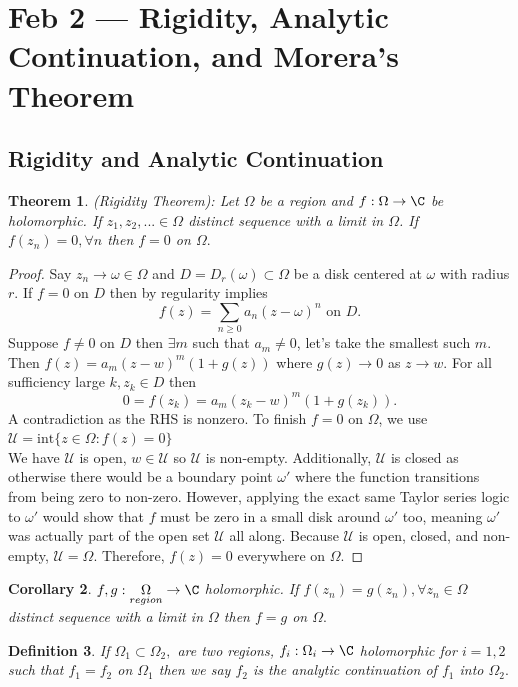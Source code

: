 \documentclass[a4paper]{article}
\newtheorem{thm}{Theorem}[section]
\newtheorem{defn}[thm]{Definition}
\newtheorem{cor}[thm]{Corollary}
\begin{document}
\section{Feb 2 --- Rigidity, Analytic Continuation, and Morera's Theorem}
\subsection{Rigidity and Analytic Continuation}
\begin{thm}
    (Rigidity Theorem): Let $\Omega$ be a region and $f:\Omega\to \C$ be holomorphic. If $z_1,z_2,...\in \Omega$ distinct sequence with a limit in $\Omega$. If $f(z_n)=0, \forall n$ then $f=0$ on $\Omega.$
\end{thm}
\begin{proof}
    Say $z_n\to \omega\in \Omega$ and $D=D_r(\omega)\subset \Omega$ be a disk centered at $\omega$ with radius $r$. If $f=0$ on $D$ then by regularity implies \[
    f(z)=\sum_{n\geq 0}a_n(z-\omega)^n \text{ on } D
    .\] 
    Suppose $f\neq 0$ on $D$ then $\exists m$ such that $a_m\neq 0$, let's take the smallest such $m$. Then $f(z)=a_m(z-w)^m(1+g(z))$ where $g(z)\to 0$ as $z\to w.$ For all sufficiency large $k, z_k\in D$ then \[
    0=f(z_k)=a_m(z_k-w)^m(1+g(z_k)) \tag{$a_m\neq 0$ and $z_k-w\neq 0$}
    .\] 
    A contradiction as the RHS is nonzero. To finish $f=0$ on $\Omega$, we use $\mathcal{U}=\text{int} \{z\in \Omega: f(z)=0\}$\\
    We have $\mathcal{U}$ is open, $w\in \mathcal{U}$ so $\mathcal{U}$ is non-empty. Additionally, $\mathcal{U}$ is closed as otherwise there would be a boundary point $\omega'$ where the function transitions from being zero to non-zero. However, applying the exact same Taylor series logic to $\omega'$ would show that $f$ must be zero in a small disk around $\omega'$ too, meaning $\omega'$ was actually part of the open set $\mathcal{U}$ all along. Because $\mathcal{U}$ is open, closed, and non-empty, $\mathcal{U} = \Omega$. Therefore, $f(z) = 0$ everywhere on $\Omega$.
\end{proof}
\begin{cor}
    $f,g:\underset{region}{\Omega}\to \C$ holomorphic. If $f(z_n)=g(z_n),  \forall z_n\in \Omega$ distinct sequence with a limit in $\Omega$ then $f=g$ on $\Omega.$
\end{cor}
\begin{defn}
    If $\Omega_1\subset \Omega_2,$ are two regions, $f_i:\Omega_i\to \C$ holomorphic for $i=1,2$ such that $f_1=f_2$ on $\Omega_1$ then we say $f_2$ is the analytic continuation of $f_1$ into $\Omega_2.$  
\end{defn}
\end{document}
